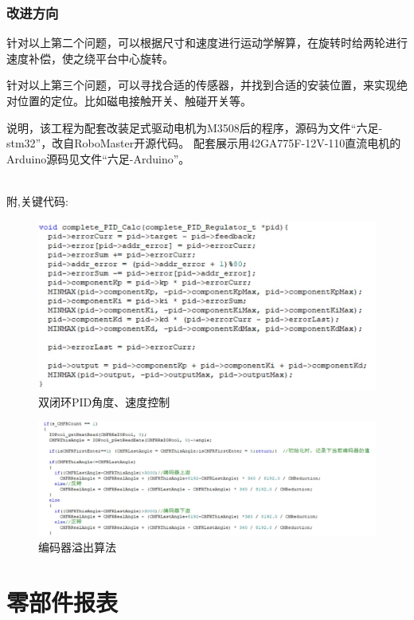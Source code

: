 \documentclass[12pt]{article}
\begin{document}
\begin{CJK}{UTF8}{song}
\subsubsection{改进方向}
针对以上第二个问题，可以根据尺寸和速度进行运动学解算，在旋转时给两轮进行速度补偿，使之绕平台中心旋转。\par
针对以上第三个问题，可以寻找合适的传感器，并找到合适的安装位置，来实现绝对位置的定位。比如磁电接触开关、触碰开关等。\par
说明，该工程为配套改装足式驱动电机为M3508后的程序，源码为文件“六足-stm32”，改自RoboMaster开源代码。 配套展示用42GA775F-12V-110直流电机的Arduino源码见文件“六足-Arduino”。\par
~\\
附,关键代码:
 \begin{figure}[H]
\centering
\includegraphics[width=.9\textwidth]{chap5//fig7.jpg}
\caption{双闭环PID角度、速度控制}
\end{figure}
 \begin{figure}[H]
\centering
\includegraphics[width=.9\textwidth]{chap5//fig8.jpg}
\caption{编码器溢出算法}
\end{figure}

\section{零部件报表}

\end{CJK}
\end{document}
